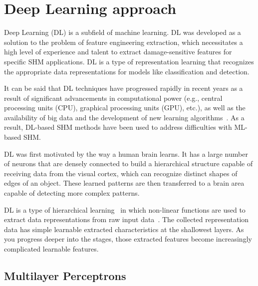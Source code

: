 \section{Deep Learning approach}
\label{sec32}

Deep Learning (DL) is a subfield of machine learning.
DL was developed as a solution to the problem of feature engineering extraction, which necessitates a high level of experience and talent to extract damage-sensitive features for specific SHM applications.
DL is a type of representation learning that recognizes the appropriate data representations for models like classification and detection.

It can be said that DL techniques have progressed rapidly in recent years as a result of significant advancements in computational power (e.g., central processing units (CPU), graphical processing units (GPU), etc.), as well as the availability of big data and the development of new learning algorithms~\cite{Yuan2020}.
As a result, DL-based SHM methods have been used to address difficulties with ML-based SHM.

DL was first motivated by the way a human brain learns.
It has a large number of neurons that are densely connected to build a hierarchical structure capable of receiving data from the visual cortex, which can recognize distinct shapes of edges of an object.
These learned patterns are then transferred to a brain area capable of detecting more complex patterns.

DL is a type of hierarchical learning~\cite{Ongsulee2018} in which non-linear functions are used to extract data representations from raw input data~\cite{Lecun2015}.
The collected representation data has simple learnable extracted characteristics at the shallowest layers.
As you progress deeper into the stages, those extracted features become increasingly complicated learnable features.

\subsection{Multilayer Perceptrons}

